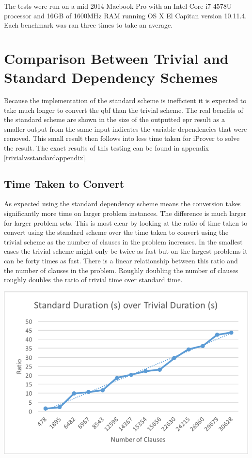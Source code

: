 The tests were run on a mid-2014 Macbook Pro with an Intel Core i7-4578U processor and 16GB of 1600MHz RAM running OS X El Capitan version 10.11.4. Each benchmark was ran three times to take an average.

\section{Comparison Between Trivial and Standard Dependency Schemes} \label{trivialvsstd}
Because the implementation of the standard scheme is inefficient it is expected to take much longer to convert the \gls{qbf} than the trivial scheme. The real benefits of the standard scheme are shown in the size of the outputted \gls{epr} result as a smaller output from the same input indicates the variable dependencies that were removed. This small result then follows into less time taken for iProver to solve the result. The exact results of this testing can be found in appendix \ref{trivialvsstandardappendix}.

\subsection{Time Taken to Convert}
As expected using the standard dependency scheme means the conversion takes significantly more time on larger problem instances. The difference is much larger for larger problem sets. This is most clear by looking at the ratio of time taken to convert using the standard scheme over the time taken to convert using the trivial scheme as the number of clauses in the problem increases. In the smallest cases the trivial scheme might only be twice as fast but on the largest problems it can be forty times as fast. There is a linear relationship between this ratio and the number of clauses in the problem. Roughly doubling the number of clauses roughly doubles the ratio of trivial time over standard time.

\begin{center}
\includegraphics{standarddurationovertrivialduration.png}
\end{center}

